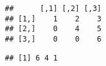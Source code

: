 \documentclass[]{article}
\newenvironment{Shaded}{\begin{snugshade}}{\end{snugshade}}
\newcommand{\KeywordTok}[1]{\textcolor[rgb]{0.13,0.29,0.53}{\textbf{#1}}}
\newcommand{\NormalTok}[1]{#1}
\newcommand{\OperatorTok}[1]{\textcolor[rgb]{0.81,0.36,0.00}{\textbf{#1}}}
\newcommand{\StringTok}[1]{\textcolor[rgb]{0.31,0.60,0.02}{#1}}
\begin{document}
\begin{verbatim}
##      [,1] [,2] [,3]
## [1,]    1    2    3
## [2,]    0    4    5
## [3,]    0    0    6
\end{verbatim}

\begin{Shaded}
\end{Shaded}

\begin{verbatim}
## [1] 6 4 1
\end{verbatim}
\end{document}

